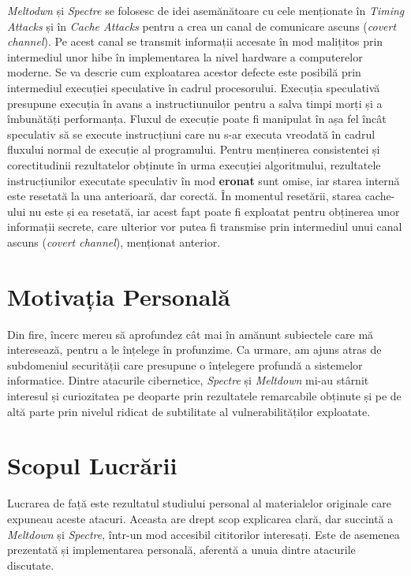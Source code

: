 \emph{Meltodwn} și \emph{Spectre} se folosesc de idei asemănătoare cu cele
menționate în \emph{Timing Attacks} și în \emph{Cache Attacks} pentru a crea un
canal de comunicare ascuns (\emph{covert channel}). Pe acest canal se transmit
informații accesate în mod malițitos prin intermediul unor hibe în
implementarea la nivel hardware a computerelor moderne. Se va descrie cum
exploatarea acestor defecte este posibilă prin intermediul execuției
speculative în cadrul procesorului. Execuția speculativă presupune execuția în
avans a instructiunuilor pentru a salva timpi morți și a îmbunătăți
performanța. Fluxul de execuție poate fi manipulat în așa fel încât speculativ
să se execute instrucțiuni care nu s-ar executa vreodată în cadrul fluxului
normal de execuție al programului. Pentru menținerea consistentei și
corectitudinii rezultatelor obținute în urma execuției algoritmului,
rezultatele instrucțiunilor executate speculativ în mod \textbf{eronat} sunt
omise, iar starea internă este resetată la una anterioară, dar corectă. În
momentul resetării, starea cache-ului nu este și ea resetată, iar acest fapt
poate fi exploatat pentru obținerea unor informații secrete, care ulterior vor
putea fi transmise prin intermediul unui canal ascuns (\emph{covert channel}),
menționat anterior.

\section{Motivația Personală}

Din fire, încerc mereu să aprofundez cât mai în amănunt subiectele care mă
interesează, pentru a le înțelege în profunzime. Ca urmare, am ajuns atras de
subdomeniul securității care presupune o înțelegere profundă a sistemelor
informatice. Dintre atacurile cibernetice, \emph{Spectre} și \emph{Meltdown}
mi-au stârnit interesul și curiozitatea pe deoparte prin rezultatele
remarcabile obținute și pe de altă parte prin nivelul ridicat de subtilitate al
vulnerabilităților exploatate.

\section{Scopul Lucrării}

Lucrarea de față este rezultatul studiului personal al materialelor originale
care expuneau aceste atacuri. Aceasta are drept scop explicarea clară, dar
succintă a \emph{Meltdown} și \emph{Spectre}, într-un mod accesibil cititorilor
interesați. Este de asemenea prezentată și implementarea personală, aferentă
a unuia dintre atacurile discutate.

